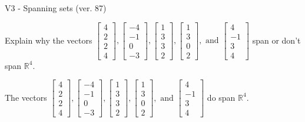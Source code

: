 \begin{exercise}
  \begin{exerciseTitle}V3 - Spanning sets (ver. 87)\end{exerciseTitle}
  \begin{exerciseStatement}
    Explain why the vectors \(\left[\begin{array}{r}
4 \\
2 \\
2 \\
4
\end{array}\right] , \left[\begin{array}{r}
-4 \\
-1 \\
0 \\
-3
\end{array}\right] , \left[\begin{array}{r}
1 \\
3 \\
3 \\
2
\end{array}\right] , \left[\begin{array}{r}
1 \\
3 \\
0 \\
2
\end{array}\right] , \text{ and } \left[\begin{array}{r}
4 \\
-1 \\
3 \\
4
\end{array}\right]\) span or don't span \(\mathbb{R}^4\). 
	


  \end{exerciseStatement}
  \begin{exerciseAnswer}
   The vectors \(\left[\begin{array}{r}
4 \\
2 \\
2 \\
4
\end{array}\right] , \left[\begin{array}{r}
-4 \\
-1 \\
0 \\
-3
\end{array}\right] , \left[\begin{array}{r}
1 \\
3 \\
3 \\
2
\end{array}\right] , \left[\begin{array}{r}
1 \\
3 \\
0 \\
2
\end{array}\right] , \text{ and } \left[\begin{array}{r}
4 \\
-1 \\
3 \\
4
\end{array}\right]\) 
  	 do  
	span \(\mathbb{R}^4\).
  


  \end{exerciseAnswer}
\end{exercise}